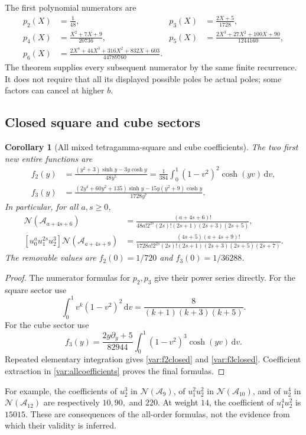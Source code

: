 \documentclass[11pt,letterpaper]{article}
\numberwithin{equation}{section}
\theoremstyle{plain}
\newtheorem{corollary}[theorem]{Corollary}
\theoremstyle{definition}
\theoremstyle{remark}
\newcommand{\dd}{\,\mathrm d}\newcommand{\iu}{\mathrm i}
\newcommand{\NN}{\mathcal N}\newcommand{\HH}{\mathcal H}
\newcommand{\Acal}{\mathcal A}\newcommand{\cA}{\mathcal A}
\begin{document}
The first polynomial numerators are
\begin{align*}
 p_2(X)&=\frac1{48},&
 p_3(X)&=\frac{2X+5}{1728},\\
 p_4(X)&=\frac{X^2+7X+9}{20736},&
 p_5(X)&=\frac{2X^3+27X^2+100X+90}{1244160},\\
 p_6(X)&=\frac{2X^4+44X^3+316X^2+832X+603}{44789760}.
\end{align*}
The theorem supplies every subsequent numerator by the same finite
recurrence. It does not require that all its displayed possible poles
be actual poles; some factors can cancel at higher $b$.

\subsection{Closed square and cube sectors}

\begin{corollary}[All mixed tetragamma-square and cube coefficients]
\label{var:squarecube}
The two first new entire functions are
\begin{align}
 f_2(y)&=\frac{(y^2+3)\sinh y-3y\cosh y}{48y^5}
       =\frac1{384}\int_0^1(1-v^2)^2\cosh(yv)\dd v,
       \label{var:f2closed}\\
 f_3(y)&=\frac{(2y^4+60y^2+135)\sinh y
                -15y(y^2+9)\cosh y}{1728y^7}.
       \label{var:f3closed}
\end{align}
In particular, for all $a,s\ge0$,
\begin{align}
 [u_0^au_1^{2s}u_2^2]\NN(\Acal_{a+4s+6})
 &=\frac{(a+4s+6)!}
 {48a!2^{2s}(2s)!(2s+1)(2s+3)(2s+5)},
 \label{var:squarecoeff}\\
 [u_0^au_1^{2s}u_2^3]\NN(\Acal_{a+4s+9})
 &=\frac{(4s+5)(a+4s+9)!}
 {1728a!2^{2s}(2s)!(2s+1)(2s+3)(2s+5)(2s+7)}.
 \label{var:cubecoeff}
\end{align}
The removable values are $f_2(0)=1/720$ and $f_3(0)=1/36288$.
\end{corollary}
\begin{proof}
The numerator formulas for $p_2,p_3$ give their power series directly.
For the square sector use
\[
 \int_0^1v^k(1-v^2)^2\dd v
 =\frac8{(k+1)(k+3)(k+5)}.
\]
For the cube sector use
\[
 f_3(y)=\frac{2y\partial_y+5}{82944}
                \int_0^1(1-v^2)^3\cosh(yv)\dd v.
\]
Repeated elementary integration gives \eqref{var:f2closed} and
\eqref{var:f3closed}. Coefficient extraction in
\eqref{var:allcoefficients} proves the final formulas.
\end{proof}

For example, the coefficients of $u_2^3$ in $\NN(\Acal_9)$,
of $u_1^2u_2^2$ in $\NN(\Acal_{10})$, and of $u_2^4$ in
$\NN(\Acal_{12})$ are respectively $10,90,$ and $220$.
At weight $14$, the coefficient of $u_1^4u_2^2$ is $15015$.
These are consequences of the all-order formulas, not the evidence
from which their validity is inferred.
\end{document}
